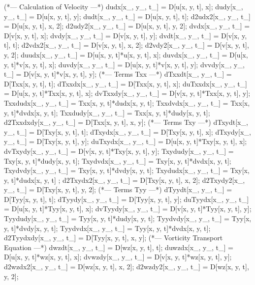 \begin{mathematicacode}[caption={Cálculo das derivadas para os termos fontes}, label={codigo:mathematica_3}]
(*--- Calculation of Velocity ---*)
dudx[x_, y_, t_] = D[u[x, y, t], x];
dudy[x_, y_, t_] = D[u[x, y, t], y];
dudt[x_, y_, t_] = D[u[x, y, t], t];
d2udx2[x_, y_, t_] = D[u[x, y, t], {x, 2}];
d2udy2[x_, y_, t_] = D[u[x, y, t], {y, 2}];
dvdx[x_, y_, t_] = D[v[x, y, t], x];
dvdy[x_, y_, t_] = D[v[x, y, t], y];
dvdt[x_, y_, t_] = D[v[x, y, t], t];
d2vdx2[x_, y_, t_] = D[v[x, y, t], {x, 2}];
d2vdy2[x_, y_, t_] = D[v[x, y, t], {y, 2}];
duudx[x_, y_, t_] = D[u[x, y, t]*u[x, y, t], x];
duvdx[x_, y_, t_] = D[u[x, y, t]*v[x, y, t], x];
duvdy[x_, y_, t_] = D[u[x, y, t]*v[x, y, t], y];
dvvdy[x_, y_, t_] = D[v[x, y, t]*v[x, y, t], y];
(*--- Terms Txx ---*) 
dTxxdt[x_, y_, t_] = D[Txx[x, y, t], t];
dTxxdx[x_, y_, t_] = D[Txx[x, y, t], x];
duTxxdx[x_, y_, t_] = D[u[x, y, t]*Txx[x, y, t], x];
dvTxxdy[x_, y_, t_] = D[v[x, y, t]*Txx[x, y, t], y];
Txxdudx[x_, y_, t_] = Txx[x, y, t]*dudx[x, y, t];
Txxdvdx[x_, y_, t_] = Txx[x, y, t]*dvdx[x, y, t];
Txxdudy[x_, y_, t_] = Txx[x, y, t]*dudy[x, y, t];
d2Txxdxdy[x_, y_, t_] = D[Txx[x, y, t], x, y];
(*--- Terms Txy ---*)
dTxydt[x_, y_, t_] = D[Txy[x, y, t], t];
dTxydx[x_, y_, t_] = D[Txy[x, y, t], x];
dTxydy[x_, y_, t_] = D[Txy[x, y, t], y];
duTxydx[x_, y_, t_] = D[u[x, y, t]*Txy[x, y, t], x];
dvTxydy[x_, y_, t_] = D[v[x, y, t]*Txy[x, y, t], y];
Txydudy[x_, y_, t_] = Txy[x, y, t]*dudy[x, y, t];
Txydvdx[x_, y_, t_] = Txy[x, y, t]*dvdx[x, y, t];
Txydvdy[x_, y_, t_] = Txy[x, y, t]*dvdy[x, y, t];
Txydudx[x_, y_, t_] = Txy[x, y, t]*dudx[x, y, t] ;
d2Txydx2[x_, y_, t_] = D[Txy[x, y, t], {x, 2}];
d2Txydy2[x_, y_, t_] = D[Txy[x, y, t], {y, 2}];
(*--- Terms Tyy ---*)
dTyydt[x_, y_, t_] = D[Tyy[x, y, t], t];
dTyydy[x_, y_, t_] = D[Tyy[x, y, t], y];
duTyydx[x_, y_, t_] = D[u[x, y, t]*Tyy[x, y, t], x];
dvTyydy[x_, y_, t_] = D[v[x, y, t]*Tyy[x, y, t], y];
Tyydudy[x_, y_, t_] = Tyy[x, y, t]*dudy[x, y, t];
Tyydvdy[x_, y_, t_] = Tyy[x, y, t]*dvdy[x, y, t];
Tyydvdx[x_, y_, t_] = Tyy[x, y, t]*dvdx[x, y, t];
d2Tyydxdy[x_, y_, t_] = D[Tyy[x, y, t], x, y];
(*--- Vorticity Transport Equation ---*)
dwzdt[x_, y_, t_] = D[wz[x, y, t], t];
duwzdx[x_, y_, t_] = D[u[x, y, t]*wz[x, y, t], x];
dvwzdy[x_, y_, t_] = D[v[x, y, t]*wz[x, y, t], y];
d2wzdx2[x_, y_, t_] = D[wz[x, y, t], {x, 2}];
d2wzdy2[x_, y_, t_] = D[wz[x, y, t], {y, 2}];
\end{mathematicacode}

